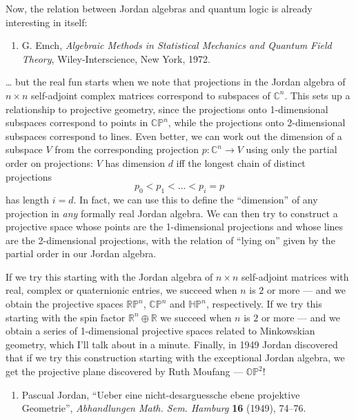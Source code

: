 \documentclass{article}
\def\tightlist{}
\begin{document}
Now, the relation between Jordan algebras and quantum logic is already
interesting in itself:

\begin{enumerate}
\def\labelenumi{\arabic{enumi})}
\setcounter{enumi}{7}
\tightlist
\item
  G. Emch, \emph{Algebraic Methods in Statistical Mechanics and Quantum
  Field Theory}, Wiley-Interscience, New York, 1972.
\end{enumerate}

\ldots{} but the real fun starts when we note that projections in the
Jordan algebra of \(n\times n\) self-adjoint complex matrices correspond
to subspaces of \(\mathbb{C}^n\). This sets up a relationship to
projective geometry, since the projections onto 1-dimensional subspaces
correspond to points in \(\mathbb{CP}^n\), while the projections onto
2-dimensional subspaces correspond to lines. Even better, we can work
out the dimension of a subspace \(V\) from the corresponding projection
\(p\colon\mathbb{C}^n\to V\) using only the partial order on
projections: \(V\) has dimension \(d\) iff the longest chain of distinct
projections \[p_0 < p_1 < \ldots < p_i = p\] has length \(i = d\). In
fact, we can use this to define the ``dimension'' of any projection in
\emph{any} formally real Jordan algebra. We can then try to construct a
projective space whose points are the 1-dimensional projections and
whose lines are the 2-dimensional projections, with the relation of
``lying on'' given by the partial order in our Jordan algebra.

If we try this starting with the Jordan algebra of \(n\times n\)
self-adjoint matrices with real, complex or quaternionic entries, we
succeed when \(n\) is \(2\) or more --- and we obtain the projective
spaces \(\mathbb{RP}^n\), \(\mathbb{CP}^n\) and \(\mathbb{HP}^n\),
respectively. If we try this starting with the spin factor
\(\mathbb{R}^n\oplus\mathbb{R}\) we succeed when \(n\) is \(2\) or more
--- and we obtain a series of 1-dimensional projective spaces related to
Minkowskian geometry, which I'll talk about in a minute. Finally, in
1949 Jordan discovered that if we try this construction starting with
the exceptional Jordan algebra, we get the projective plane discovered
by Ruth Moufang --- \(\mathbb{OP}^2\)!

\begin{enumerate}
\def\labelenumi{\arabic{enumi})}
\setcounter{enumi}{8}
\tightlist
\item
  Pascual Jordan, ``Ueber eine nicht-desarguessche ebene projektive
  Geometrie'', \emph{Abhandlungen Math. Sem. Hamburg} \textbf{16}
  (1949), 74--76.
\end{enumerate}
\end{document}
